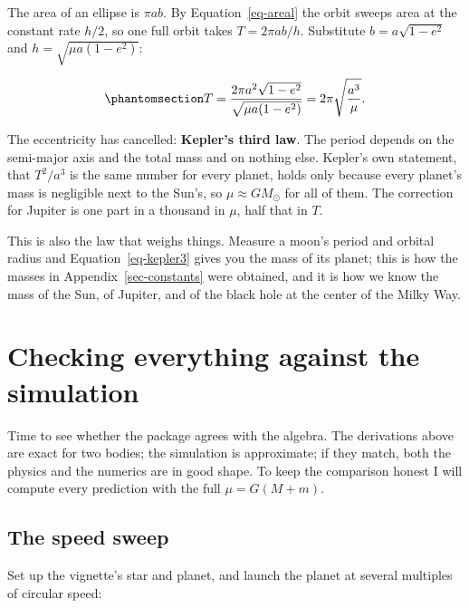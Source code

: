 \documentclass[
  10.5pt,
  letterpaper,
]{scrbook}
\theoremstyle{plain}
\theoremstyle{remark}
\begin{document}
The area of an ellipse is \(\pi a b\). By Equation~\ref{eq-areal} the
orbit sweeps area at the constant rate \(h/2\), so one full orbit takes
\(T = 2\pi ab/h\). Substitute \(b = a\sqrt{1-e^2}\) and
\(h = \sqrt{\mu a (1-e^2)}\):

\begin{equation}\protect\phantomsection\label{eq-kepler3}{
T = \frac{2\pi a^2\sqrt{1-e^2}}{\sqrt{\mu a(1-e^2)}} = 2\pi\sqrt{\frac{a^3}{\mu}}.
}\end{equation}

The eccentricity has cancelled: \textbf{Kepler's third law}. The period
depends on the semi-major axis and the total mass and on nothing else.
Kepler's own statement, that \(T^2/a^3\) is the same number for every
planet, holds only because every planet's mass is negligible next to the
Sun's, so \(\mu \approx GM_\odot\) for all of them. The correction for
Jupiter is one part in a thousand in \(\mu\), half that in \(T\).

This is also the law that weighs things. Measure a moon's period and
orbital radius and Equation~\ref{eq-kepler3} gives you the mass of its
planet; this is how the masses in Appendix~\ref{sec-constants} were
obtained, and it is how we know the mass of the Sun, of Jupiter, and of
the black hole at the center of the Milky Way.

\section{Checking everything against the
simulation}\label{checking-everything-against-the-simulation}

Time to see whether the package agrees with the algebra. The derivations
above are exact for two bodies; the simulation is approximate; if they
match, both the physics and the numerics are in good shape. To keep the
comparison honest I will compute every prediction with the full
\(\mu = G(M+m)\).

\subsection{The speed sweep}\label{the-speed-sweep}

Set up the vignette's star and planet, and launch the planet at several
multiples of circular speed:
\end{document}
